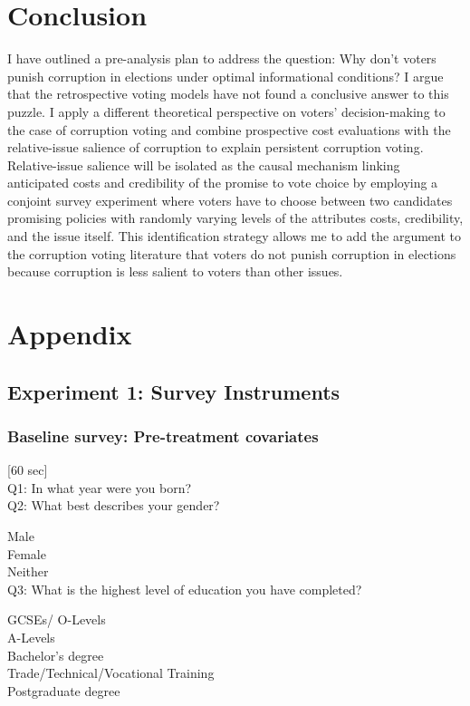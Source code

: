 \documentclass[11pt]{article}
\begin{document}
\section{Conclusion}
I have outlined a pre-analysis plan to address the question: Why don't voters punish corruption in elections under optimal informational conditions? I argue that the retrospective voting models have not found a conclusive answer to this puzzle. I apply a different theoretical perspective on voters' decision-making to the case of corruption voting and combine prospective cost evaluations with the relative-issue salience of corruption to explain persistent corruption voting. Relative-issue salience will be isolated as the causal mechanism linking anticipated costs and credibility of the promise to vote choice by employing a conjoint survey experiment where voters have to choose between two candidates promising policies with randomly varying levels of the attributes costs, credibility, and the issue itself. This identification strategy allows me to add the argument to the corruption voting literature that voters do not punish corruption in elections because corruption is less salient to voters than other issues.

\newpage
\section{Appendix}
\singlespacing
\subsection{Experiment 1: Survey Instruments} \label{sec1}
\subsubsection{Baseline survey: Pre-treatment covariates}
[60 sec]\\

\noindent Q1: In what year were you born?\\

\noindent Q2: What best describes your gender?

\noindent Male\\
Female\\
Neither\\

\noindent Q3: What is the highest level of education you have completed?

\noindent GCSEs/ O-Levels\\
A-Levels\\
Bachelor’s degree\\
Trade/Technical/Vocational Training\\
Postgraduate degree\\
\end{document}
